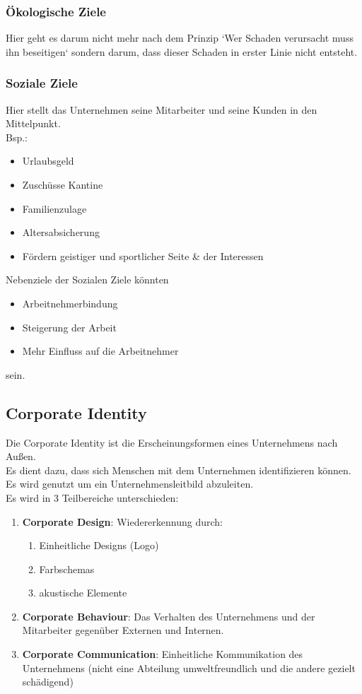 \documentclass[10pt]{article}
\begin{document}
\subsubsection{Ökologische Ziele}
Hier geht es darum nicht mehr nach dem Prinzip `Wer Schaden verursacht muss ihn beseitigen` sondern darum, dass dieser Schaden in erster Linie nicht entsteht.

\subsubsection{Soziale Ziele}
Hier stellt das Unternehmen seine Mitarbeiter und seine Kunden in den Mittelpunkt. \\
Bsp.:
\begin{itemize}
\item Urlaubsgeld
\item Zuschüsse  Kantine
\item Familienzulage
\item Altersabsicherung
\item Fördern geistiger und sportlicher Seite \& der Interessen
\end{itemize}
Nebenziele der Sozialen Ziele könnten
\begin{itemize}
\item Arbeitnehmerbindung
\item Steigerung der Arbeit
\item Mehr Einfluss auf die Arbeitnehmer
\end{itemize}
sein.

\subsection{Corporate Identity}
Die Corporate Identity ist die Erscheinungsformen eines Unternehmens nach Außen. \\
Es dient dazu, dass sich Menschen mit dem Unternehmen identifizieren können. \\
Es wird genutzt um ein Unternehmensleitbild abzuleiten. \\
Es wird in 3 Teilbereiche unterschieden:
\begin{enumerate}
\item \textbf{Corporate Design}: Wiedererkennung durch:
\begin{enumerate}
\item Einheitliche Designs (Logo)
\item Farbschemas
\item akustische Elemente
\end{enumerate}
\item \textbf{Corporate Behaviour}: Das Verhalten des Unternehmens und der Mitarbeiter  gegenüber Externen und Internen.
\item \textbf{Corporate Communication}: Einheitliche Kommunikation des Unternehmens (nicht eine Abteilung umweltfreundlich und die andere gezielt schädigend)
\end{enumerate}
\end{document}
